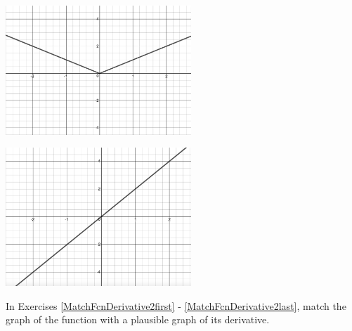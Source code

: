 \begin{center}
\begin{multicols}{2}
\includegraphics[width=2.75in]{./IntroductiontoDerivativesGraphics/MatchFunc03.jpeg}

\includegraphics[width=2.75in]{./IntroductiontoDerivativesGraphics/MatchDeriv02.jpeg}

\end{multicols}


\end{center}

In Exercises \ref{MatchFcnDerivative2first} - \ref{MatchFcnDerivative2last}, match the graph of the function with a plausible graph of its derivative.


